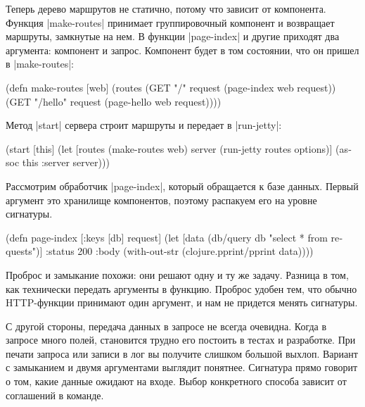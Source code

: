Теперь дерево маршрутов не статично, потому что зависит от компонента. Функция
\spverb|make-routes| принимает группировочный компонент и возвращает маршруты,
замкнутые на нем. В функции \spverb|page-index| и другие приходят два аргумента:
компонент и запрос. Компонент будет в том состоянии, что он пришел в
\spverb|make-routes|:

\begin{english}
  \begin{clojure}
(defn make-routes [web]
  (routes
   (GET "/"      request (page-index web request))
   (GET "/hello" request (page-hello web request))))
  \end{clojure}
\end{english}

Метод \spverb|start| сервера строит маршруты и передает в \spverb|run-jetty|:

\begin{english}
  \begin{clojure}
(start [this]
  (let [routes (make-routes web)
        server (run-jetty routes options)]
    (assoc this :server server)))
  \end{clojure}
\end{english}

Рассмотрим обработчик \spverb|page-index|, который обращается к базе
данных. Первый аргумент это хранилище компонентов, поэтому распакуем его на
уровне сигнатуры.

\begin{english}
  \begin{clojure}
(defn page-index
  [{:keys [db]} request]
  (let [data (db/query db "select * from requests")]
    {:status 200
     :body (with-out-str
             (clojure.pprint/pprint data))}))
  \end{clojure}
\end{english}

Проброс и замыкание похожи: они решают одну и ту же задачу. Разница в том, как
технически передать аргументы в функцию. Проброс удобен тем, что обычно
HTTP-функции принимают один аргумент, и нам не придется менять сигнатуры.

С другой стороны, передача данных в запросе не всегда очевидна. Когда в запросе
много полей, становится трудно его постоить в тестах и разработке. При печати
запроса или записи в лог вы получите слишком большой выхлоп. Вариант с
замыканием и двумя аргументами выглядит понятнее. Сигнатура прямо говорит о том,
какие данные ожидают на входе. Выбор конкретного способа зависит от соглашений в
команде.

